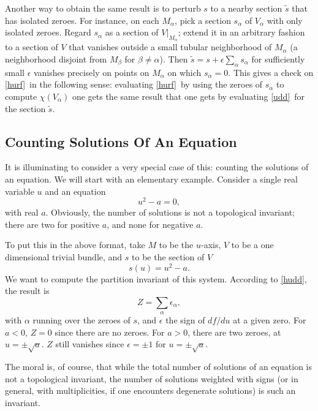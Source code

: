 \documentclass[12pt]{article}
\numberwithin{equation}{section}
\def\tilde{\widetilde}
\begin{document}
Another way to obtain the same result is to perturb $s$ to a nearby
section $\tilde s$ that has isolated zeroes.  For instance,
on each $M_\alpha$, pick a section $s_\alpha$ of $V_\alpha$ with only
isolated zeroes.  Regard $s_\alpha$ as a section of $V|_{M_\alpha}$; extend
it in an arbitrary fashion to a section of $V$ that vanishes outside
a small tubular neighborhood of $M_\alpha$ (a neighborhood disjoint
from $M_\beta$ for $\beta\not=\alpha$).  Then $\tilde s=s+\epsilon
\sum_\alpha s_\alpha$ for sufficiently small $\epsilon$
vanishes precisely on points on
$M_\alpha$ on which $s_\alpha=0$.
This gives a check on \eqref{hurf}\ in the following sense: evaluating
\eqref{hurf}\ by using the zeroes of $s_\alpha$ to compute $\chi(V_\alpha)$ one
gets the same result that one gets by
evaluating \eqref{udd}\ for the section $\tilde s$.

\subsection{Counting Solutions Of An Equation}

It is illuminating to consider a very special case of this:
counting the solutions of an equation.  We will
start with an elementary example.  Consider a single
real variable $u$ and an equation
\begin{equation}
  \label{sinfr}
  u^2-a= 0,
\end{equation}
with real $a$.  Obviously, the number of solutions is not a topological
invariant; there are two for positive $a$, and none for negative $a$.

To put this in the above format, take $M$ to be the $u$-axis, $V$ to be
a one dimensional trivial bundle, and $s$ to be the section of $V$
\begin{equation}
  \label{vinfr}
  s(u) =u^2-a.
\end{equation}
We want to compute the partition invariant of this system.  According
to \eqref{hudd}, the result is
\begin{equation}
  \label{urfo}
  Z=\sum_\alpha \epsilon_\alpha,
\end{equation}
with $\alpha$ running over the zeroes of $s$, and $\epsilon$ the sign
of $df/du$ at a given zero.  For $a<0$, $Z=0$ since there are no zeroes.
For $a>0$, there are two zeroes, at $u=\pm\sqrt a$.  $Z$ still vanishes
since $\epsilon=\pm 1$ for $u=\pm \sqrt a$.

The moral is, of course, that while the total number of solutions
of an equation is not a topological invariant, the number
of solutions weighted with signs (or in general, with multiplicities,
if one encounters degenerate solutions) is such an invariant.
\end{document}
